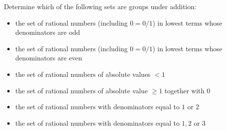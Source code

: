 \documentclass[12pt]{article}
\newenvironment{problem}[2][Exercise]{\begin{trivlist}
\item[\hskip \labelsep {\bfseries #1}\hskip \labelsep {\bfseries #2.}]}{\end{trivlist}}
\begin{document}
\begin{problem}{1.1.6}
Determine which of the following sets are groups under addition:
\begin{itemize}
    \item the set of rational numbers (including $0=0/1$) in lowest terms whose denominators are odd
    \item the set of rational numbers (including $0=0/1$) in lowest terms whose denominators are even
    \item the set of rational numbers of absolute values $< 1$
    \item the set of rational numbers of absolute value $\geq 1$ together with $0$
    \item the set of rational numbers with denominators equal to $1$ or $2$
    \item the set of rational numbers with denominators equal to $1,2$ or $3$
\end{itemize}
\end{problem}
\end{document}
